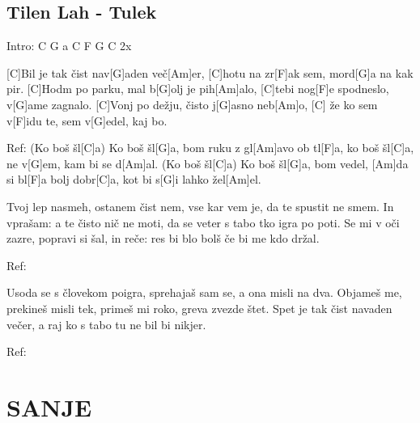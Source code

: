 \documentclass{article}
\begin{document}
\subsection*{Tilen Lah - Tulek}
\begin{guitar}
	Intro: C G a C F G C 2x

	[C]Bil je tak čist nav[G]aden več[Am]er,
	[C]hotu na zr[F]ak sem, mord[G]a na kak pir.
	[C]Hodm po parku, mal b[G]olj je pih[Am]alo,
	[C]tebi nog[F]e spodneslo, v[G]ame zagnalo.
	[C]Vonj po dežju, čisto j[G]asno neb[Am]o,
	[C] že ko sem v[F]idu te, sem v[G]edel, kaj bo.
	\linebreak
	
	Ref:
	(Ko boš šl[C]a) Ko boš šl[G]a, bom ruku z gl[Am]avo ob tl[F]a,
	ko boš šl[C]a, ne v[G]em, kam bi se d[Am]al.
	(Ko boš šl[C]a) Ko boš šl[G]a, bom vedel, [Am]da si bl[F]a bolj dobr[C]a,
	kot bi s[G]i lahko žel[Am]el.
	\linebreak

	Tvoj lep nasmeh, ostanem čist nem,
	vse kar vem je, da te spustit ne smem.
	In vprašam: a te čisto nič ne moti, da se
	veter s tabo tko igra po poti.
	Se mi v oči zazre, popravi si šal, in reče:
	res bi blo bolš če bi me kdo držal.
	\linebreak

	Ref:
	\linebreak

	Usoda se s človekom poigra,
	sprehajaš sam se, a ona misli na dva.
	Objameš me, prekineš misli tek,
	primeš mi roko, greva zvezde štet.
	Spet je tak čist navaden večer,
	a raj ko s tabo tu ne bil bi nikjer.
	\linebreak

	Ref:

\end{guitar}
\pagebreak

\section*{SANJE}
%
\end{document}
